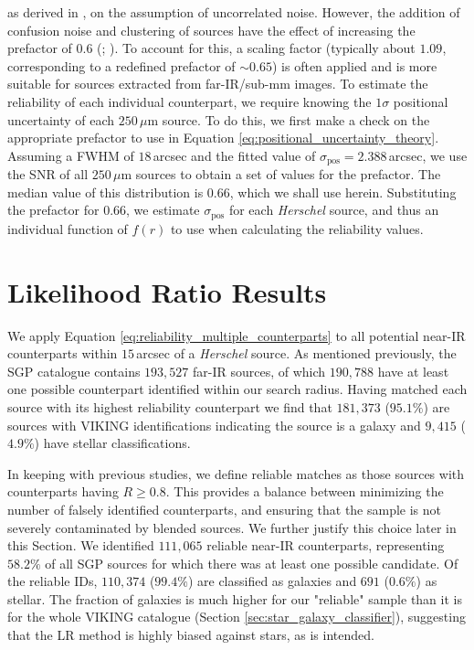 \noindent as derived in \citealt{Ivison_2007}, on the assumption of uncorrelated noise. However, the addition of confusion noise and clustering of sources have the effect of increasing the prefactor of $0.6$ (\citealt{Chapin_2011}; \citealt{Bourne_2014}). To account for this, a scaling factor (typically about $1.09$, corresponding to a redefined prefactor of $\sim 0.65$) is often applied and is more suitable for sources extracted from far-IR/sub-mm images. To estimate the reliability of each individual counterpart, we require knowing the $1\sigma$ positional uncertainty of each $250\,\mu$m source. To do this, we first make a check on the appropriate prefactor to use in Equation \ref{eq:positional_uncertainty_theory}. Assuming a FWHM of $18\,$arcsec and the fitted value of $\sigma_{\textrm{pos}} = 2.388\,$arcsec, we use the SNR of all $250\,\mu$m sources to obtain a set of values for the prefactor. The median value of this distribution is $0.66$, which we shall use herein. Substituting the prefactor for $0.66$, we estimate $\sigma_{\textrm{pos}}$ for each \textit{Herschel} source, and thus an individual function of $f(r)$ to use when calculating the reliability values.

\section{Likelihood Ratio Results}
\label{sec:lr_results}

We apply Equation \ref{eq:reliability_multiple_counterparts} to all potential near-IR counterparts within $15\,$arcsec of a \textit{Herschel} source. As mentioned previously, the SGP catalogue contains $193,527$ far-IR sources, of which $190,788$ have at least one possible counterpart identified within our search radius. Having matched each source with its highest reliability counterpart we find that $181,373$ ($95.1\%$) are sources with VIKING identifications indicating the source is a galaxy and $9,415$ ($4.9\%$) have stellar classifications. 

In keeping with previous studies, we define reliable matches as those sources with counterparts having $R \geq 0.8$. This provides a balance between minimizing the number of falsely identified counterparts, and ensuring that the sample is not severely contaminated by blended sources. We further justify this choice later in this Section. We identified $111,065$ reliable near-IR counterparts, representing $58.2\%$ of all SGP sources for which there was at least one possible candidate. Of the reliable IDs, $110,374$ ($99.4\%$) are classified as galaxies and $691$ ($0.6\%$) as stellar. The fraction of galaxies is much higher for our "reliable" sample than it is for the whole VIKING catalogue (Section \ref{sec:star_galaxy_classifier}), suggesting that the LR method is highly biased against stars, as is intended. 


